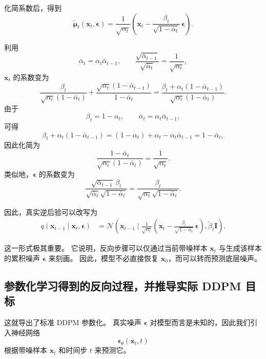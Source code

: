 化简系数后，得到
\[
\tilde{\boldsymbol{\mu}}_t(\mathbf{x}_t,\boldsymbol{\epsilon})
=
\frac{1}{\sqrt{\alpha_t}}
\left(
\mathbf{x}_t
-
\frac{\beta_t}{\sqrt{1-\bar{\alpha}_t}}\,
\boldsymbol{\epsilon}
\right).
\]

\begin{tcolorbox}[
  colback=blue!6,
  colframe=blue!55!black,
  title={系数化简背后的代数过程},
  boxrule=0.8pt,
  arc=2mm,
  left=2mm,
  right=2mm,
  top=1mm,
  bottom=1mm
]
利用
\[
\bar{\alpha}_t=\alpha_t\bar{\alpha}_{t-1},
\qquad
\frac{\sqrt{\bar{\alpha}_{t-1}}}{\sqrt{\bar{\alpha}_t}}
=
\frac{1}{\sqrt{\alpha_t}},
\]
$\mathbf{x}_t$ 的系数变为
\[
\frac{\beta_t}{\sqrt{\alpha_t}(1-\bar{\alpha}_t)}
+
\frac{\sqrt{\alpha_t}(1-\bar{\alpha}_{t-1})}{1-\bar{\alpha}_t}
=
\frac{
\beta_t+\alpha_t(1-\bar{\alpha}_{t-1})
}{
\sqrt{\alpha_t}(1-\bar{\alpha}_t)
}.
\]
由于
\[
\beta_t=1-\alpha_t,
\qquad
\bar{\alpha}_t=\alpha_t\bar{\alpha}_{t-1},
\]
可得
\[
\beta_t+\alpha_t(1-\bar{\alpha}_{t-1})
=
(1-\alpha_t)+\alpha_t-\alpha_t\bar{\alpha}_{t-1}
=
1-\bar{\alpha}_t,
\]
因此化简为
\[
\frac{1-\bar{\alpha}_t}{\sqrt{\alpha_t}(1-\bar{\alpha}_t)}
=
\frac{1}{\sqrt{\alpha_t}}.
\]
类似地，$\boldsymbol{\epsilon}$ 的系数变为
\[
\frac{
\sqrt{\bar{\alpha}_{t-1}}\,\beta_t
}{
\sqrt{\bar{\alpha}_t}\sqrt{1-\bar{\alpha}_t}
}
=
\frac{\beta_t}{\sqrt{\alpha_t}\sqrt{1-\bar{\alpha}_t}}.
\]
\end{tcolorbox}

因此，真实逆后验可以改写为
\[
\boxed{
\begin{aligned}
q(\mathbf{x}_{t-1}\mid \mathbf{x}_t,\boldsymbol{\epsilon})
&=
\mathcal{N}\!\left(
\mathbf{x}_{t-1}\mid
\frac{1}{\sqrt{\alpha_t}}
\left(
\mathbf{x}_t
-
\frac{\beta_t}{\sqrt{1-\bar{\alpha}_t}}\,
\boldsymbol{\epsilon}
\right),
\tilde{\beta}_t\mathbf{I}
\right).
\end{aligned}
}
\]

这一形式极其重要。
它说明，反向步骤可以仅通过当前带噪样本 $\mathbf{x}_t$ 与生成该样本的累积噪声 $\boldsymbol{\epsilon}$ 来刻画。
因此，模型不必直接恢复 $\mathbf{x}_0$，而可以转而预测底层噪声。

\subsection{参数化学习得到的反向过程，并推导实际 DDPM 目标}

这就导出了标准 DDPM 参数化。
真实噪声 $\boldsymbol{\epsilon}$ 对模型而言是未知的，因此我们引入神经网络
\[
\boldsymbol{\epsilon}_\theta(\mathbf{x}_t,t)
\]
根据带噪样本 $\mathbf{x}_t$ 和时间步 $t$ 来预测它。

